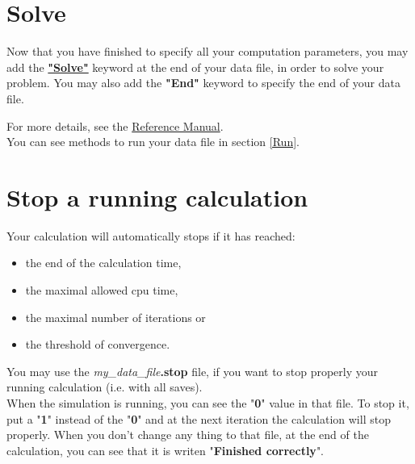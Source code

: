 \section{Solve}
Now that you have finished to specify all your computation parameters, you may add the \href{\REFERENCEMANUAL\#solve}{\textbf{"Solve"}} keyword at the end of your data file, in order to solve your problem.
You may also add the \textbf{"End"} keyword to specify the end of your data file.

    \begin{center}
    \end{center}

For more details, see the \href{\REFERENCEMANUAL\#solve}{\trustref Reference Manual}. \\

You can see methods to run your data file in section \ref{Run}.



\section{Stop a running calculation} \label{stopfile}
Your calculation will automatically stops if it has reached:
\begin{itemize}
\item the end of the calculation time,
\item the maximal allowed cpu time,
\item the maximal number of iterations or
\item the threshold of convergence.
\end{itemize}

You may use the \textit{my\_data\_file}\textbf{.stop} file, if you want to stop properly your running calculation (i.e. with all saves).\\

When the simulation is running, you can see the "\textbf{0}" value in that file.
To stop it, put a "\textbf{1}" instead of the "\textbf{0}" and at the next iteration the calculation will stop properly.
When you don't change any thing to that file, at the end of the calculation, you can see that it is writen "\textbf{Finished correctly}".



